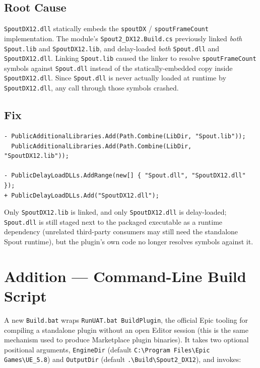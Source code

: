\documentclass[11pt,a4paper]{article}
\begin{document}
\subsection{Root Cause}
\texttt{SpoutDX12.dll} statically embeds the \texttt{spoutDX} /
\texttt{spoutFrameCount} implementation. The module's
\texttt{Spout2\_DX12.Build.cs} previously linked \emph{both}
\texttt{Spout.lib} and \texttt{SpoutDX12.lib}, and delay-loaded \emph{both}
\texttt{Spout.dll} and \texttt{SpoutDX12.dll}. Linking \texttt{Spout.lib}
caused the linker to resolve \texttt{spoutFrameCount} symbols against
\texttt{Spout.dll} instead of the statically-embedded copy inside
\texttt{SpoutDX12.dll}. Since \texttt{Spout.dll} is never actually loaded
at runtime by \texttt{SpoutDX12.dll}, any call through those symbols
crashed.

\subsection{Fix}
\begin{lstlisting}[basicstyle=\ttfamily\small,backgroundcolor=\color{codebg},frame=single,breaklines=true]
- PublicAdditionalLibraries.Add(Path.Combine(LibDir, "Spout.lib"));
  PublicAdditionalLibraries.Add(Path.Combine(LibDir, "SpoutDX12.lib"));

- PublicDelayLoadDLLs.AddRange(new[] { "Spout.dll", "SpoutDX12.dll" });
+ PublicDelayLoadDLLs.Add("SpoutDX12.dll");
\end{lstlisting}

Only \texttt{SpoutDX12.lib} is linked, and only \texttt{SpoutDX12.dll} is
delay-loaded; \texttt{Spout.dll} is still staged next to the packaged
executable as a runtime dependency (unrelated third-party consumers may
still need the standalone Spout runtime), but the plugin's own code no
longer resolves symbols against it.

\section{Addition --- Command-Line Build Script}
\label{sec:build}

A new \texttt{Build.bat} wraps
\texttt{RunUAT.bat BuildPlugin}, the official Epic tooling for compiling a
standalone plugin without an open Editor session (this is the same
mechanism used to produce Marketplace plugin binaries). It takes two
optional positional arguments, \texttt{EngineDir} (default
\texttt{C:\textbackslash Program Files\textbackslash Epic
Games\textbackslash UE\_5.8}) and \texttt{OutputDir} (default
\texttt{.\textbackslash Build\textbackslash Spout2\_DX12}), and invokes:
\end{document}
